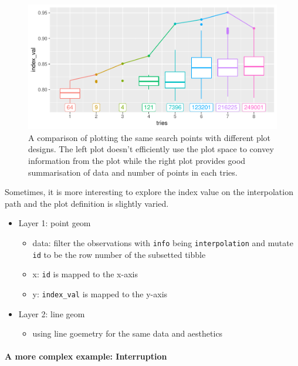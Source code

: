 \documentclass[12pt]{article}
\providecommand{\tightlist}{%
  \setlength{\itemsep}{0pt}\setlength{\parskip}{0pt}}
\begin{document}
\begin{figure}
\centering
\includegraphics{paper_files/figure-latex/points-tries-1.pdf}
\caption{\label{points}A comparison of plotting the same search points
with different plot designs. The left plot doesn't efficiently use the
plot space to convey information from the plot while the right plot
provides good summarisation of data and number of points in each tries.}
\end{figure}

Sometimes, it is more interesting to explore the index value on the
interpolation path and the plot definition is slightly varied.

\begin{itemize}
\tightlist
\item
  Layer 1: point geom

  \begin{itemize}
  \tightlist
  \item
    data: filter the observations with \texttt{info} being
    \texttt{interpolation} and mutate \texttt{id} to be the row number
    of the subsetted tibble
  \item
    x: \texttt{id} is mapped to the x-axis
  \item
    y: \texttt{index\_val} is mapped to the y-axis
  \end{itemize}
\item
  Layer 2: line geom

  \begin{itemize}
  \tightlist
  \item
    using line goemetry for the same data and aesthetics
  \end{itemize}
\end{itemize}

\hypertarget{a-more-complex-example-interruption}{%
\paragraph{A more complex example:
Interruption}\label{a-more-complex-example-interruption}}
\end{document}
